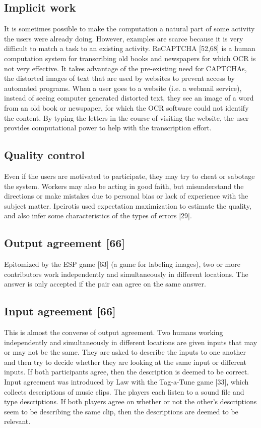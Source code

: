 \documentclass{sig-alternate}
\begin{document}
\subsection*{Implicit work}
It is sometimes possible to make the computation a natural part of some activity the users were already doing. However, examples are scarce because it is very difficult to match a task to an existing activity.
ReCAPTCHA [52,68] is a human computation system for transcribing old books and newspapers for which OCR is not very effective. It takes advantage of the pre-existing need for CAPTCHAs, the distorted images of text that are used by websites to prevent access by automated programs. When a user goes to a website (i.e. a webmail service), instead of seeing computer generated distorted text, they see an image of a word from an old book or newspaper, for which the OCR software could not identify the content. By typing the letters in the course of visiting the website, the user provides computational power to help with the transcription effort.
\subsection*{Quality control}
Even if the users are motivated to participate, they may try to cheat or sabotage the system. Workers may also be acting in good faith, but misunderstand the directions or make mistakes due to personal bias or lack of experience with the subject matter. Ipeirotis used expectation maximization to estimate the quality, and also infer some characteristics of the types of errors [29].
\subsection*{Output agreement [66]}
Epitomized by the ESP game [63] (a game for labeling images), two or more contributors work independently and simultaneously in different locations. The answer is only accepted if the pair can agree on the same answer.
\subsection*{Input agreement [66]}
This is almost the converse of output agreement. Two humans working independently and simultaneously in different locations are given inputs that may or may not be the same. They are asked to describe the inputs to one another and then try to decide whether they are looking at the same input or different inputs. If both participants agree, then the description is deemed to be correct.
Input agreement was introduced by Law with the Tag-a-Tune game [33], which collects descriptions of music clips. The players each listen to a sound file and type descriptions. If both players agree on whether or not the other’s descriptions seem to be describing the same clip, then the descriptions are deemed to be relevant.
\end{document}
